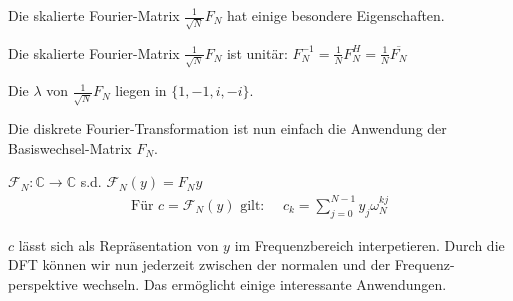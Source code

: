 Die skalierte Fourier-Matrix $\frac{1}{\sqrt{N}}F_N$ hat einige besondere Eigenschaften.

\inlinetheorem Die skalierte Fourier-Matrix $\frac{1}{\sqrt{N}}F_N$ ist unitär: $F_N^{-1} = \frac{1}{N} F_N^H = \frac{1}{N} \overline{F_N}$

 Die $\lambda$ von $\frac{1}{\sqrt{N}}F_N$ liegen in $\{1,-1,i,-i\}$.

Die diskrete Fourier-Transformation ist nun einfach die Anwendung der Basiswechsel-Matrix $F_N$.

 $\mathcal{F}_N: \mathbb{C} \to \mathbb{C}$ s.d. $\mathcal{F}_N(y) = F_Ny$
\begin{align*}
    \text{Für } c = \mathcal{F}_N(y) \text{ gilt: }\quad c_k = \sum_{j=0}^{N-1} y_j \omega_N^{kj}
\end{align*}

$c$ lässt sich als Repräsentation von $y$ im Frequenzbereich interpetieren. Durch die DFT können wir nun jederzeit zwischen der normalen und der Frequenz-perspektive wechseln. Das ermöglicht einige interessante Anwendungen.

